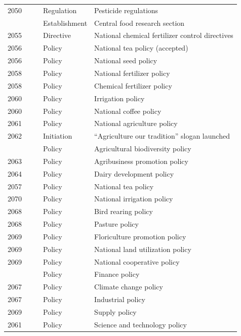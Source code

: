 \documentclass[
  openany]{book}
\begin{document}
\begin{table}[H]
\begin{tabular}[t]{rrrll}
\rowcolor{gray!6}  2050 &  &  & Regulation & Pesticide \vphantom{1} regulations\\
\addlinespace
2052 &  &  & Establishment & Central food research section\\
\rowcolor{gray!6}  2055 &  &  & Directive & National chemical fertilizer control directives\\
2056 &  &  & Policy & National tea policy (accepted)\\
\rowcolor{gray!6}  2056 &  &  & Policy & National seed policy\\
2058 &  &  & Policy & National fertilizer policy\\
\addlinespace
\rowcolor{gray!6}  2058 &  &  & Policy & Chemical fertilizer policy\\
2060 &  &  & Policy & Irrigation policy\\
\rowcolor{gray!6}  2060 &  &  & Policy & National coffee policy\\
2061 &  &  & Policy & National agriculture policy\\
\rowcolor{gray!6}  2062 &  &  & Initiation & “Agriculture our tradition” slogan launched\\
\addlinespace
2063 &  &  & Policy & Agricultural biodiversity policy\\
\rowcolor{gray!6}  2063 &  &  & Policy & Agribusiness promotion policy\\
2064 &  &  & Policy & Dairy development policy\\
\rowcolor{gray!6}  2057 &  &  & Policy & National tea policy\\
2070 &  &  & Policy & National irrigation policy\\
\addlinespace
\rowcolor{gray!6}  2068 &  &  & Policy & Bird rearing policy\\
2068 &  &  & Policy & Pasture policy\\
\rowcolor{gray!6}  2069 &  &  & Policy & Floriculture promotion policy\\
2069 &  &  & Policy & National land utilization policy\\
\rowcolor{gray!6}  2069 &  &  & Policy & National cooperative policy\\
\addlinespace
2072 &  &  & Policy & Finance policy\\
\rowcolor{gray!6}  2067 &  &  & Policy & Climate change policy\\
2067 &  &  & Policy & Industrial policy\\
\rowcolor{gray!6}  2069 &  &  & Policy & Supply policy\\
2061 &  &  & Policy & Science and technology policy\\

\end{tabular}
\end{table}
\end{document}

